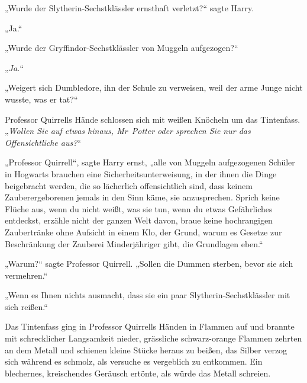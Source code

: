 „Wurde der Slytherin-Sechstklässler ernsthaft verletzt?“ sagte Harry.

„Ja.“

„Wurde der Gryffindor-Sechstklässler von Muggeln aufgezogen?“

„\emph{Ja.}“

„Weigert sich Dumbledore, ihn der Schule zu verweisen, weil der arme Junge nicht wusste, was er tat?“

Professor Quirrells Hände schlossen sich mit weißen Knöcheln um das Tintenfass. „\emph{Wollen Sie auf etwas hinaus, Mr~Potter oder sprechen Sie nur das} \emph{Offensichtliche aus?}“

„Professor Quirrell“, sagte Harry ernst, „alle von Muggeln aufgezogenen Schüler in Hogwarts brauchen eine Sicherheitsunterweisung, in der ihnen die Dinge beigebracht werden, die so lächerlich offensichtlich sind, dass keinem Zauberergeborenen jemals in den Sinn käme, sie anzusprechen. Sprich keine Flüche aus, wenn du nicht weißt, was sie tun, wenn du etwas Gefährliches entdeckst, erzähle nicht der ganzen Welt davon, braue keine hochrangigen Zaubertränke ohne Aufsicht in einem Klo, der Grund, warum es Gesetze zur Beschränkung der Zauberei Minderjähriger gibt, die Grundlagen eben.“

„Warum?“ sagte Professor Quirrell. „Sollen die Dummen sterben, bevor sie sich vermehren.“

„Wenn es Ihnen nichts ausmacht, dass sie ein paar Slytherin-Sechstklässler mit sich reißen.“

Das Tintenfass ging in Professor Quirrells Händen in Flammen auf und brannte mit schrecklicher Langsamkeit nieder, grässliche schwarz-orange Flammen zehrten an dem Metall und schienen kleine Stücke heraus zu beißen, das Silber verzog sich während es schmolz, als versuche es vergeblich zu entkommen. Ein blechernes, kreischendes Geräusch ertönte, als würde das Metall schreien.

